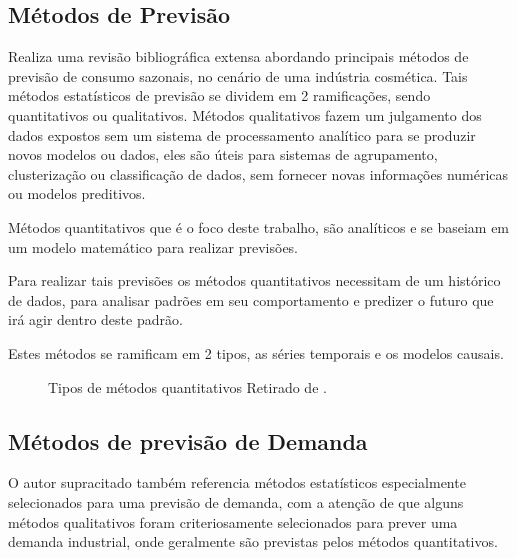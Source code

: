 \documentclass[	12pt, Times, openright, twoside, a4paper, english, brazil]{abntex2}
\begin{document}
        \subsection{Métodos de Previsão} 

          \cite{Junior2007} Realiza uma revisão bibliográfica extensa abordando principais métodos de previsão de consumo sazonais, no cenário de uma indústria cosmética. Tais métodos estatísticos de previsão se dividem em 2 ramificações, sendo quantitativos ou qualitativos. Métodos qualitativos fazem um julgamento dos dados expostos sem um sistema de processamento analítico para se produzir novos modelos ou dados, eles são úteis para sistemas de agrupamento, clusterização ou classificação de dados, sem fornecer novas informações numéricas ou modelos preditivos.

          Métodos quantitativos que é o foco deste trabalho, são analíticos e se baseiam em um modelo matemático para realizar previsões. 

          Para realizar tais previsões os métodos quantitativos necessitam de um histórico de dados, para analisar padrões em seu comportamento e predizer o futuro que irá agir dentro deste padrão.

          Estes métodos se ramificam em 2 tipos, as séries temporais e os modelos causais.
          \begin{figure}[!ht]
          	\caption{Tipos de métodos quantitativos Retirado de \cite{Junior2007}.\label{fig:metodosQuantitativos}}
          \end{figure}

        \subsection{Métodos de previsão de Demanda}
          O autor supracitado também referencia métodos estatísticos especialmente selecionados para uma previsão de demanda, com a atenção de que alguns métodos qualitativos foram criteriosamente selecionados para prever uma demanda industrial, onde geralmente são previstas pelos métodos quantitativos.
\end{document}
